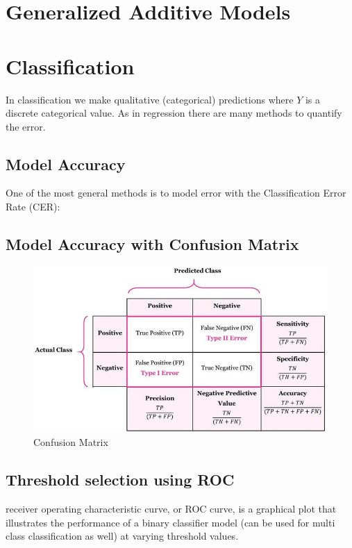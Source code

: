 \documentclass[../Main.tex]{subfiles}
\begin{document}
\section{Generalized Additive Models}

\newpage
\section{Classification}
In classification we make qualitative (categorical) predictions where \(Y\) is a discrete categorical value.
As in regression there are many methods to quantify the error.

\subsection{Model Accuracy}
One of the most general methods is to model error with the Classification Error Rate (CER):

\subsection{Model Accuracy with Confusion Matrix}
\begin{figure}[H]
    \centering
    \includegraphics[width=0.75\linewidth]{Images/conf-matrix.jpg}
    \caption{Confusion Matrix}
\end{figure}

\subsection{Threshold selection using ROC}
receiver operating characteristic curve, or ROC curve,
is a graphical plot that illustrates the performance of a binary classifier model
(can be used for multi class classification as well) at varying threshold values.
\end{document}
